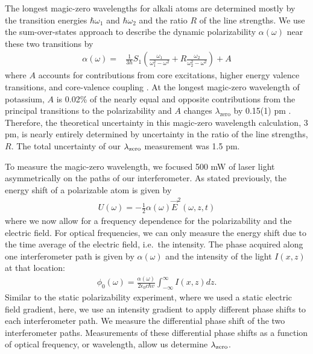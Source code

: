 The longest magic-zero wavelengths for alkali atoms are determined mostly by the transition energies $\hbar\omega_1$ and $\hbar\omega_2$ and the ratio $R$ of the line strengths. We use the sum-over-states approach to describe the dynamic polarizability $\alpha(\omega)$ near these two transitions by
\begin{eqnarray}
\label{dynpol}
\alpha(\omega) = & \frac{1}{3\hbar} S_1 \left( \frac{\omega_1}{  \omega_{1}^2 - \omega^2} + R\frac{\omega_{2}} { \omega_{2}^2 - \omega^2} \right) + A
\end{eqnarray}
where $A$ accounts for contributions from core excitations, higher energy valence transitions, and core-valence coupling \cite{Saf06, Mit10}. At the longest magic-zero wavelength of potassium, $A$ is 0.02\% of the nearly equal and opposite contributions from the principal transitions to the polarizability and $A$ changes $\lambda_\textrm{zero}$ by 0.15(1) pm \cite{Saf12per}. Therefore, the theoretical uncertainty in this magic-zero wavelength calculation, 3 pm, is nearly entirely determined by uncertainty in the ratio of the line strengths, $R$. The total uncertainty of our $\lambda_\textrm{zero}$ measurement was 1.5 pm. 


To measure the magic-zero wavelength, we focused 500 mW of laser light asymmetrically on the paths of our interferometer. As stated previously, the energy shift of a polarizable atom is given by 
\begin{eqnarray}
U(\omega) = -\frac{1}{2} \alpha(\omega) \vec{E}^2(\omega,z,t)
\end{eqnarray}
where we now allow for a frequency dependence for the polarizability and the electric field. For optical frequencies, we can only measure the energy shift due to the time average of the electric field, i.e.~the intensity. The phase acquired along one interferometer path is given by $\alpha(\omega)$ and the intensity of the light $I(x,z)$ at that location:
\begin{eqnarray}
\label{mzwIntEqn}
\phi_0(\omega) = \frac{\alpha(\omega)}{2\epsilon_0 c \hbar v}\int_{-\infty}^{\infty}I(x,z) dz.
\end{eqnarray}
Similar to the static polarizability experiment, where we used a static electric field gradient, here, we use an intensity gradient to apply different phase shifts to each interferometer path. We measure the differential phase shift of the two interferometer paths. Measurements of these differential phase shifts as a function of optical frequency, or wavelength, allow us determine $\lambda_\textrm{zero}$.


